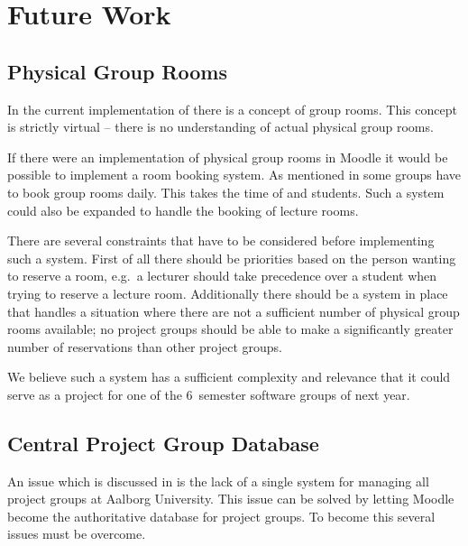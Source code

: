 \chapter{Future Work}
\label{chap:futurework}


\section{Physical Group Rooms}
\label{sec:booking}
In the current implementation of \system{} there is a concept of group rooms.
This concept is strictly virtual -- there is no understanding of actual physical group rooms.

If there were an implementation of physical group rooms in Moodle it would be possible to implement a room booking system.
As mentioned in  some groups have to book group rooms daily.
This takes the time of \admpers{} and students.
Such a system could also be expanded to handle the booking of lecture rooms.

There are several constraints that have to be considered before implementing such a system.
First of all there should be priorities based on the person wanting to reserve a room, e.g.\ a lecturer should take precedence over a student when trying to reserve a lecture room.
Additionally there should be a system in place that handles a situation where there are not a sufficient number of physical group rooms available; no project groups should be able to make a significantly greater number of reservations than other project groups.

We believe such a system has a sufficient complexity and relevance that it could serve as a project for one of the $6$\ths~semester software groups of next year.

\section{Central Project Group Database}
An issue which is discussed in  is the lack of a single system for managing all project groups at Aalborg University. 
This issue can be solved by letting Moodle become the authoritative database for project groups. 
To become this several issues must be overcome. 

